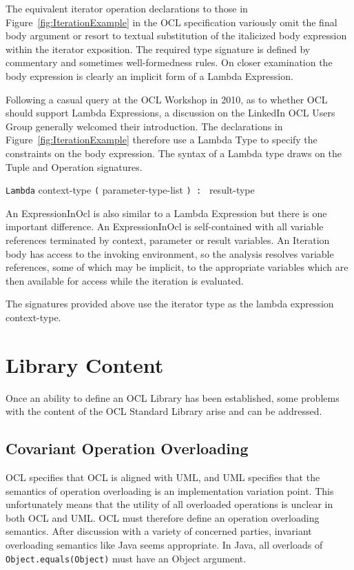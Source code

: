 \documentclass{eceasst}
\begin{document}
The equivalent iterator operation declarations to those in Figure~\ref{fig:IterationExample} in the OCL specification variously omit the final body argument or resort to textual substitution of the italicized body expression within the iterator exposition. The required type signature is defined by commentary and sometimes well-formedness rules. On closer examination the body expression is clearly an implicit form of a Lambda Expression.

Following a casual query at the OCL Workshop in 2010, as to whether OCL should support Lambda Expressions, a discussion on the LinkedIn OCL Users Group\cite{LinkedIn} generally welcomed their introduction. The declarations in Figure~\ref{fig:IterationExample} therefore use a Lambda Type to specify the constraints on the body expression. The syntax of a Lambda type draws on the Tuple and Operation signatures.

\verb|Lambda| context-type \verb|(| parameter-type-list \verb|) : | result-type

An ExpressionInOcl is also similar to a Lambda Expression but there is one important difference. An ExpressionInOcl is self-contained with all variable references terminated by context, parameter or result variables. An Iteration body has access to the invoking environment, so the analysis resolves variable references, some of which may be implicit, to the appropriate variables which are then available for access while the iteration is evaluated.

The signatures provided above use the iterator type as the lambda expression context-type.

\section{Library Content}\label{LibraryContent}

Once an ability to define an OCL Library has been established, some problems with the content of the OCL Standard Library arise and can be addressed. 

\subsection{Covariant Operation Overloading}

OCL specifies that OCL is aligned with UML, and UML specifies that the semantics of operation overloading is an implementation variation point. This unfortunately means that the utility of all overloaded operations is unclear in both OCL and UML. OCL must therefore define an operation overloading semantics. After discussion with a variety of concerned parties, invariant overloading semantics like Java seems appropriate. In Java, all overloads of \verb|Object.equals(Object)| must have an Object argument.
\end{document}
